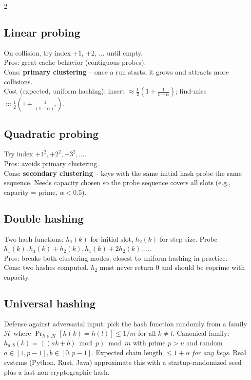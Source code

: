 \documentclass[10pt]{article}
\begin{document}
\begin{multicols}{2}
\subsection*{Linear probing}
On collision, try index $+1$, $+2$, $\ldots$ until empty.\\
Pros: great cache behavior (contiguous probes).\\
Cons: \textbf{primary clustering} -- once a run starts, it grows and
attracts more collisions.\\
Cost (expected, uniform hashing): insert $\approx
\frac{1}{2}(1 + \frac{1}{1-\alpha})$; find-miss $\approx
\frac{1}{2}(1 + \frac{1}{(1-\alpha)^2})$.

\subsection*{Quadratic probing}
Try index $+1^2, +2^2, +3^2, \ldots$.\\
Pros: avoids primary clustering.\\
Cons: \textbf{secondary clustering} -- keys with the same initial hash
probe the same sequence. Needs capacity chosen so the probe sequence
covers all slots (e.g., capacity = prime, $\alpha < 0.5$).

\subsection*{Double hashing}
Two hash functions: $h_1(k)$ for initial slot, $h_2(k)$ for step size.
Probe $h_1(k), h_1(k) + h_2(k), h_1(k) + 2 h_2(k), \ldots$.\\
Pros: breaks both clustering modes; closest to uniform hashing in
practice.\\
Cons: two hashes computed. $h_2$ must never return 0 and should be
coprime with capacity.

\columnbreak

\subsection*{Universal hashing}
Defense against adversarial input: pick the hash function randomly
from a family $\mathcal{H}$ where
$\Pr_{h \in \mathcal{H}}[h(k) = h(l)] \leq 1/m$ for all $k \neq l$.
Canonical family: $h_{a,b}(k) = ((ak + b) \bmod p) \bmod m$ with
prime $p > u$ and random $a \in [1, p{-}1], b \in [0, p{-}1]$.
Expected chain length $\leq 1 + \alpha$ \emph{for any keys}. Real
systems (Python, Rust, Java) approximate this with a startup-randomized
seed plus a fast non-cryptographic hash.


\end{multicols}
\end{document}
